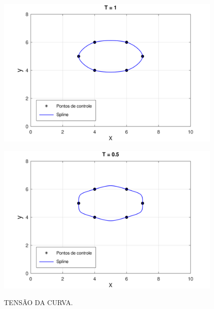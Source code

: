 \begin{figure}[h!]
    \caption{TENSÃO DA CURVA.}
    \centering
    \begin{minipage}[b]{0.45\textwidth}
        \centering
        \includegraphics[width=1\linewidth]{fig/cat_rom_t1.png}
        \label{fig:tesao1}
    \end{minipage}
    \hfill
    \begin{minipage}[b]{0.45\textwidth}
        \centering
        \includegraphics[width=1\linewidth]{fig/cat_rom_t05.png}
        \label{fig:tensao05}
    \end{minipage}

    \vspace{1cm}


\end{figure}

